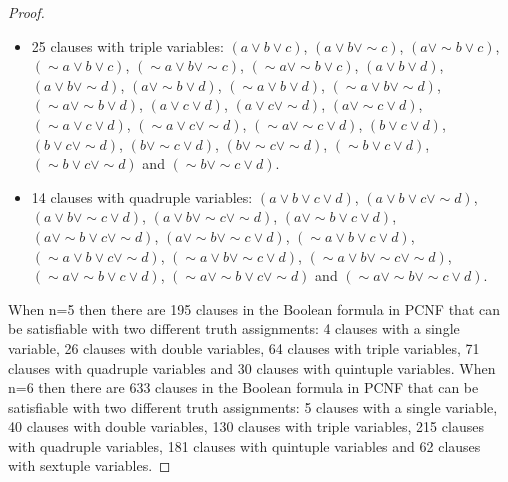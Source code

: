 \documentclass[runningheads,a4paper]{llncs}
\let\oldsim\sim
\renewcommand{\sim}{{\oldsim}}
\begin{document}
\begin{theorem}
\begin{proof}
\begin{itemize}
\begin{itemize}
    \item 25 clauses with triple variables: 
$({a}\vee {b} \vee {c})$, $({a}\vee {b} \vee \sim {c})$, $({a}\vee \sim {b} \vee {c})$, 
$(\sim {a}\vee {b} \vee {c})$, $(\sim {a}\vee {b} \vee \sim {c})$, $( \sim {a}\vee \sim {b} \vee {c})$, 
$({a}\vee {b} \vee {d})$, $({a}\vee {b} \vee \sim {d})$, $({a}\vee \sim {b} \vee {d})$, $(\sim {a}\vee {b} \vee {d})$, $(\sim {a}\vee {b} \vee \sim {d})$, $( \sim {a}\vee \sim {b} \vee {d})$, 
$({a}\vee {c} \vee {d})$, $({a}\vee {c} \vee \sim {d})$, $({a}\vee \sim {c} \vee {d})$, $(\sim {a}\vee {c} \vee {d})$, $(\sim {a}\vee {c} \vee \sim {d})$, $( \sim {a}\vee \sim {c} \vee {d})$,
$({b}\vee {c} \vee {d})$, $({b}\vee {c} \vee \sim {d})$, $({b}\vee \sim {c} \vee {d})$, $({b}\vee \sim {c} \vee \sim {d})$, $(\sim {b}\vee {c} \vee {d})$, $(\sim {b}\vee {c} \vee \sim  {d})$ and $(\sim {b}\vee \sim {c} \vee {d})$.
   \item 14 clauses with quadruple variables:
$({a}\vee {b} \vee {c} \vee {d})$, $({a}\vee {b} \vee {c} \vee \sim {d})$, 
$({a}\vee {b} \vee \sim {c} \vee {d})$, $({a}\vee {b} \vee \sim {c} \vee \sim {d})$, 
$({a}\vee \sim{b} \vee {c} \vee {d})$, $({a}\vee \sim{b} \vee {c} \vee \sim {d})$, 
$({a}\vee \sim{b} \vee \sim {c} \vee {d})$, $(\sim {a}\vee {b} \vee {c} \vee {d})$, 
$(\sim {a}\vee {b} \vee {c} \vee \sim {d})$, $(\sim {a}\vee {b} \vee \sim {c} \vee {d})$, 
$(\sim {a}\vee {b} \vee \sim {c} \vee \sim {d})$, $(\sim {a}\vee \sim{b} \vee {c} \vee {d})$, 
$( \sim{a}\vee \sim{b} \vee {c} \vee \sim {d})$ and $(\sim {a}\vee \sim{b} \vee \sim {c} \vee {d})$.
    \end{itemize}
\end{itemize}

When n=5 then there are 195 clauses in the Boolean formula in PCNF that can be satisfiable with two different truth assignments: 4 clauses with a single variable, 26 clauses with double variables, 64 clauses with triple variables, 71 clauses with quadruple variables and 30 clauses with quintuple variables. When n=6 then there are 633 clauses in the Boolean formula in PCNF that can be satisfiable with two different truth assignments: 5 clauses with a single variable, 40 clauses with double variables, 130 clauses with triple variables, 215 clauses with quadruple variables, 181 clauses with quintuple variables and 62 clauses with sextuple variables. 


\end{proof}
\end{theorem}
\end{document}
